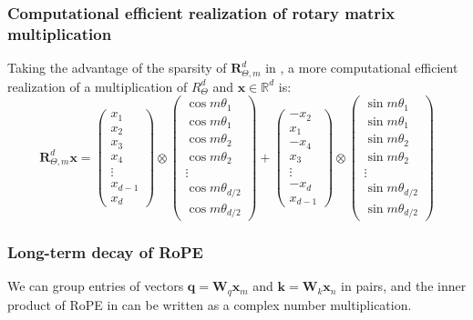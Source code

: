 \documentclass{article}
\def\q{{\boldsymbol q}}
\def\k{{\boldsymbol k}}
\def\x{{\boldsymbol x}}
\def\W{{\boldsymbol W}}
\def\R{{\boldsymbol R}}
\begin{document}
\subsubsection{Computational efficient realization of rotary matrix multiplication}\label{appendix:rope-efficient}
Taking the advantage of the sparsity of $\R^d_{\Theta, m}$ in , a more computational efficient realization of a multiplication of $R^d_\Theta$ and $\x \in \mathbb{R}^d$ is:  
\begin{equation}
	\R^d_{\Theta, m}\x = 
	\begin{pmatrix}
		x_1\\
		x_2\\
		x_3\\
		x_4\\
		\vdots\\
		x_{d-1}\\
		x_d
	\end{pmatrix}
	\otimes
	\begin{pmatrix}
		\cos{m\theta_1} \\
		\cos{m\theta_1} \\
		\cos{m\theta_2} \\
		\cos{m\theta_2} \\
		\vdots \\
		\cos{m\theta_{d/2}} \\
		\cos{m\theta_{d/2}} 
	\end{pmatrix}
	+
	\begin{pmatrix}
		-x_2\\
		x_1\\
		-x_4\\
		x_3\\
		\vdots\\
		-x_d\\
		x_{d-1}
	\end{pmatrix}
	\otimes
	\begin{pmatrix}
		\sin{m\theta_1}\\
		\sin{m\theta_1}\\
		\sin{m\theta_2}\\
		\sin{m\theta_2}\\
		\vdots\\
		\sin{m\theta_{d/2}}\\
		\sin{m\theta_{d/2}}
	\end{pmatrix}
\end{equation} 




\subsubsection{Long-term decay of RoPE}\label{appendix:long-term-decay}
We can group entries of vectors $\q=\W_q\x_m$ and $\k=\W_k\x_n$ in pairs, and the inner product of RoPE in  can be written as a complex number multiplication.
\end{document}
